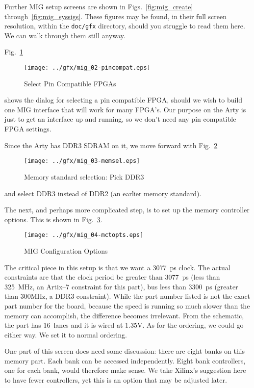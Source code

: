 \documentclass{gqtekspec}
\begin{document}
Further MIG setup screens are shown in Figs.~\ref{fig:mig_create}
through~\ref{fig:mig_syssigs}.  These figures may be found, in their full
screen resolution, within the {\tt doc/gfx} directory, should you struggle to
read them here.  We can walk through them still anyway.

Fig.~\ref{fig:mig_pincompat}
\begin{figure}\begin{center}
\texttt{[image: ../gfx/mig\_02-pincompat.eps]}
\caption{Select Pin Compatible FPGAs}\label{fig:mig_pincompat}
\end{center}\end{figure}
shows the dialog for selecting a pin compatible FPGA, should we wish to build
one MIG interface that will work for many FPGA's.  Our purpose on the Arty is
just to get an interface up and running, so we don't need any pin compatible
FPGA settings.

Since the Arty has DDR3 SDRAM on it, we move forward with
Fig.~\ref{fig:mig_memsel}
\begin{figure}\begin{center}
\texttt{[image: ../gfx/mig\_03-memsel.eps]}
\caption{Memory standard selection: Pick DDR3}\label{fig:mig_memsel}
\end{center}\end{figure}
and select DDR3 instead of DDR2 (an earlier memory standard).

The next, and perhaps more complicated step, is to set up the memory controller
options.  This is shown in Fig.~\ref{fig:mig_mctopts}.
\begin{figure}\begin{center}
\texttt{[image: ../gfx/mig\_04-mctopts.eps]}
\caption{MIG Configuration Options}\label{fig:mig_mctopts}
\end{center}\end{figure}
The critical piece in this setup is that we want a 3077~ps clock.  The actual
constraints are that the clock period be greater than 3077~ps (less than
325~MHz, an Artix--7 constraint for this part), bus less than 3300~ps (greater
than 300MHz, a DDR3 constraint).  While the part number listed is not the 
exact part number for the board, because the speed is running so much slower
than the memory can accomplish, the difference becomes irrelevant.  From the
schematic, the part has 16~lanes and it is wired at 1.35V.  As for the ordering,
we could go either way.  We set it to normal ordering.

One part of this screen does need some discussion: there are eight banks on this
memory part.  Each bank can be accessed independently.  Eight bank controllers,
one for each bank, would therefore make sense.  We take Xilinx's suggestion
here to have fewer controllers, yet this is an option that may be adjusted
later.
\end{document}
